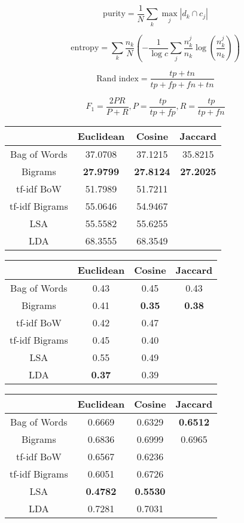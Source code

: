 \documentclass[10pt]{article}
\begin{document}
\[ \text{purity} = \frac{1}{N} \sum_k \max_j |d_k \cap c_j |\]

\[ \text{entropy} = \sum_k \frac{n_k}{N} \left( -\frac{1}{\log c} \sum_j \frac{n^j_k}{n_k} \log \left(\frac{n^j_k}{n_k}\right) \right) \]

\[ \text{Rand index} = \frac{tp + tn}{tp + fp + fn + tn}  \]

\[ F_1 = \frac{2PR}{P + R}, P = \frac{tp}{tp + fp}, R = \frac{tp}{tp + fn} \]

\begin{center}
\begin{tabular}{|c|c|c|c|}
  \hline
  ~ & Euclidean & Cosine & Jaccard \\ \hline \hline
  Bag of Words & 37.0708 & 37.1215 & 35.8215 \\ \hline
  Bigrams & \textbf{27.9799} & \textbf{27.8124} & \textbf{27.2025} \\ \hline
  tf-idf BoW & 51.7989 & 51.7211 & \\ \hline
  tf-idf Bigrams & 55.0646 & 54.9467 & \\ \hline
  LSA & 55.5582 & 55.6255 & \\ \hline
  LDA & 68.3555 & 68.3549 & \\ \hline
\end{tabular}
\end{center}

\begin{center}
\begin{tabular}{|c|c|c|c|}
 \hline
  & Euclidean & Cosine & Jaccard \\ \hline \hline
  Bag of Words & 0.43 & 0.45 & 0.43 \\ \hline
  Bigrams & 0.41 & \textbf{0.35} & \textbf{0.38} \\ \hline
  tf-idf BoW & 0.42 & 0.47 & \\ \hline
  tf-idf Bigrams & 0.45 & 0.40 & \\ \hline
  LSA & 0.55 & 0.49 & \\ \hline
  LDA & \textbf{0.37} & 0.39 & \\ \hline
\end{tabular}
\end{center}


\begin{center}
\begin{tabular}{|c|c|c|c|}
  \hline
  & Euclidean & Cosine & Jaccard \\ \hline \hline
  Bag of Words & 0.6669 & 0.6329 & \textbf{0.6512} \\ \hline
  Bigrams & 0.6836 & 0.6999 & 0.6965 \\ \hline
  tf-idf BoW & 0.6567 & 0.6236 &  \\ \hline
  tf-idf Bigrams & 0.6051 & 0.6726 &  \\ \hline
  LSA & \textbf{0.4782} & \textbf{0.5530} & \\ \hline
  LDA & 0.7281 & 0.7031 & \\ \hline
\end{tabular}
\end{center}
\end{document}
